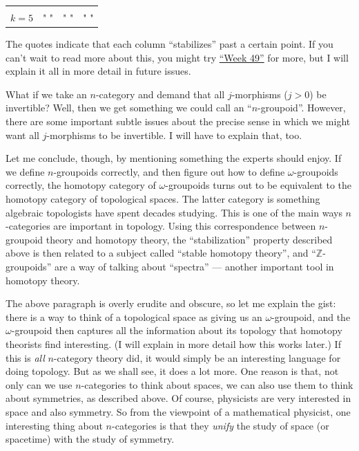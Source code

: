 \documentclass{article}
\begin{document}
\begin{longtable}[]{@{}llll@{}}
\begin{minipage}[t]{0.21\columnwidth}
\strut
\end{minipage}\tabularnewline
\begin{minipage}[t]{0.26\columnwidth}\raggedright
\(k=5\)\strut
\end{minipage} & \begin{minipage}[t]{0.21\columnwidth}\raggedright
" "\strut
\end{minipage} & \begin{minipage}[t]{0.21\columnwidth}\raggedright
" "\strut
\end{minipage} & \begin{minipage}[t]{0.21\columnwidth}\raggedright
" "\strut
\end{minipage}\tabularnewline
\bottomrule
\end{longtable}

The quotes indicate that each column ``stabilizes'' past a certain
point. If you can't wait to read more about this, you might try
\protect\hyperlink{week49}{``Week 49''} for more, but I will explain it
all in more detail in future issues.

What if we take an \(n\)-category and demand that all \(j\)-morphisms
(\(j > 0\)) be invertible? Well, then we get something we could call an
``\(n\)-groupoid''. However, there are some important subtle issues
about the precise sense in which we might want all \(j\)-morphisms to be
invertible. I will have to explain that, too.

Let me conclude, though, by mentioning something the experts should
enjoy. If we define \(n\)-groupoids correctly, and then figure out how
to define \(\omega\)-groupoids correctly, the homotopy category of
\(\omega\)-groupoids turns out to be equivalent to the homotopy category
of topological spaces. The latter category is something algebraic
topologists have spent decades studying. This is one of the main ways
\(n\)-categories are important in topology. Using this correspondence
between \(n\)-groupoid theory and homotopy theory, the ``stabilization''
property described above is then related to a subject called ``stable
homotopy theory'', and ``\(\mathbb{Z}\)-groupoids'' are a way of talking
about ``spectra'' --- another important tool in homotopy theory.

The above paragraph is overly erudite and obscure, so let me explain the
gist: there is a way to think of a topological space as giving us an
\(\omega\)-groupoid, and the \(\omega\)-groupoid then captures all the
information about its topology that homotopy theorists find interesting.
(I will explain in more detail how this works later.) If this is
\emph{all} \(n\)-category theory did, it would simply be an interesting
language for doing topology. But as we shall see, it does a lot more.
One reason is that, not only can we use \(n\)-categories to think about
spaces, we can also use them to think about symmetries, as described
above. Of course, physicists are very interested in space and also
symmetry. So from the viewpoint of a mathematical physicist, one
interesting thing about \(n\)-categories is that they \emph{unify} the
study of space (or spacetime) with the study of symmetry.
\end{document}
